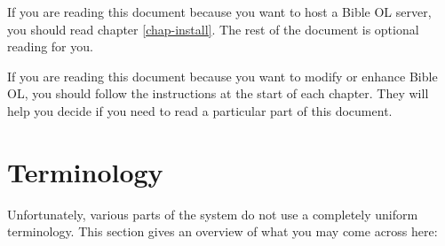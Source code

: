 \documentclass[11pt,oneside,a4paper]{memoir}
\begin{document}
If you are reading this document because you want to host a Bible OL server, you should read chapter
\ref{chap-install}. The rest of the document is optional reading for you.

If you are reading this document because you want to modify or enhance Bible OL, you should follow
the instructions at the start of each chapter. They will help you decide if you need to read a
particular part of this document.




\section{Terminology}\label{sec-terminology}

Unfortunately, various parts of the system do not use a completely uniform terminology. This section
gives an overview of what you may come across here:
\end{document}
